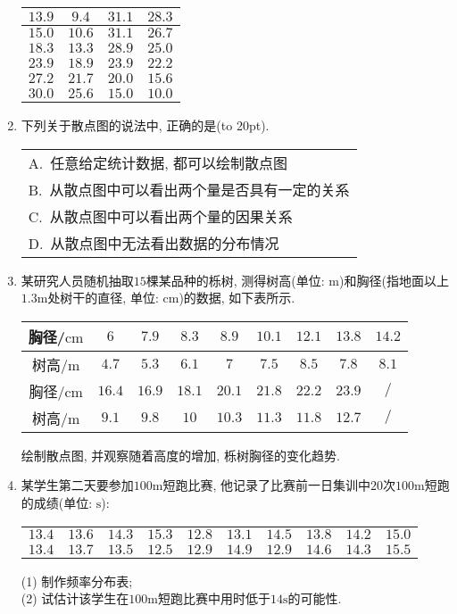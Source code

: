 \documentclass[10pt,a4paper]{article}
\newcommand{\bracket}[1]{(\hbox to #1pt{})}
\newcommand{\onech}[4]{\par\begin{tabular}{p{.9\textwidth}}
A.~#1\\
B.~#2\\
C.~#3\\
D.~#4
\end{tabular}}
\begin{document}
\begin{enumerate}[1.]
\begin{center}
\begin{tabular}{|c|c|c|c|}
$13.9$ & $9.4$ & $31.1$ & $28.3$ \\ \hline
$15.0$ & $10.6$ & $31.1$ & $26.7$ \\ \hline
$18.3$ & $13.3$ & $28.9$ & $25.0$ \\ \hline
$23.9$ & $18.9$ & $23.9$ & $22.2$ \\ \hline
$27.2$ & $21.7$ & $20.0$ & $15.6$ \\ \hline
$30.0$ & $25.6$ & $15.0$ & $10.0$ \\ \hline
\end{tabular}
\end{center}
\item 下列关于散点图的说法中, 正确的是\bracket{20}.
\onech{任意给定统计数据, 都可以绘制散点图}{从散点图中可以看出两个量是否具有一定的关系}{从散点图中可以看出两个量的因果关系}{从散点图中无法看出数据的分布情况}
\item 某研究人员随机抽取$15$棵某品种的栎树, 测得树高(单位: $\text{m}$)和胸径(指地面以上$1.3\text{m}$处树干的直径, 单位: $\text{cm}$)的数据, 如下表所示.
\begin{center}
\begin{tabular}{|c|c|c|c|c|c|c|c|c|}
\hline
胸径/$\text{cm}$ & $6$ & $7.9$ & $8.3$ & $8.9$ & $10.1$ & $12.1$ & $13.8$ & $14.2$ \\ \hline
树高/$\text{m}$ & $4.7$ & $5.3$ & $6.1$ & $7$ & $7.5$ & $8.5$ & $7.8$ & $8.1$ \\ \hline
胸径/$\text{cm}$ & $16.4$ & $16.9$ & $18.1$ & $20.1$ & $21.8$ & $22.2$ & $23.9$ & $\slash$ \\ \hline
树高/$\text{m}$ & $9.1$ & $9.8$ & $10$ & $10.3$ & $11.3$ & $11.8$ & $12.7$ & $\slash$ \\ \hline
\end{tabular}
\end{center}
绘制散点图, 并观察随着高度的增加, 栎树胸径的变化趋势. 
\item 某学生第二天要参加$100\text{m}$短跑比赛, 他记录了比赛前一日集训中$20$次$100\text{m}$短跑的成绩(单位: $\text{s}$):
\begin{center}
\begin{tabular}{cccccccccc}
$13.4$ & $13.6$ & $14.3$ & $15.3$ & $12.8$ & $13.1$ & $14.5$ & $13.8$ & $14.2$ & $15.0$ \\ 
$13.4$ & $13.7$ & $13.5$ & $12.5$ & $12.9$ & $14.9$ & $12.9$ & $14.6$ & $14.3$ & $15.5$ 
\end{tabular}
\end{center}
(1) 制作频率分布表;\\
(2) 试估计该学生在$100\text{m}$短跑比赛中用时低于$14\text{s}$的可能性.

\end{enumerate}
\end{document}
